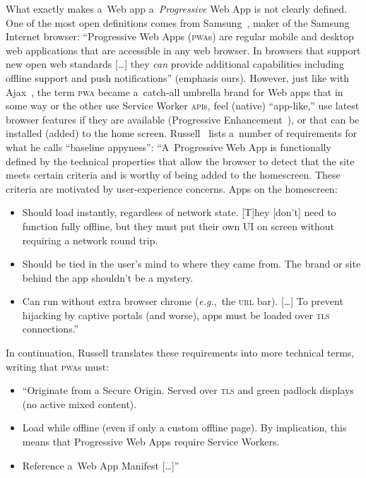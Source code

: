 \documentclass[sigconf]{acmart}
\begin{document}
What exactly makes a~Web app a~\emph{Progressive} Web App is not clearly defined.
One of the most open definitions comes from Samsung~\cite{samsung2017pwa},
maker of the Samsung Internet browser:
``Progressive Web Apps (\textsc{pwa}s) are regular mobile and desktop web applications
that are accessible in any web browser.
In browsers that support new open web standards [\ldots]
they \emph{can} provide additional capabilities
including offline support and push notifications'' (emphasis ours).
However, just like with Ajax~\cite{garret2005ajax}, the term \textsc{pwa}
became a~catch-all umbrella brand for Web apps
that in some way or the other use Service Worker \textsc{api}s,
feel (native) ``app-like,'' use latest browser features if they are available
(Progressive Enhancement~\cite{champeon2003progressiveenhancement}),
or that can be installed (added) to the home screen.
Russell~\cite{russell2016pwa} lists a~number of requirements 
for what he calls ``baseline appyness'':
``A~Progressive Web App is functionally defined by the technical properties
that allow the browser to detect that the site meets certain criteria
and is worthy of being added to the homescreen.
These criteria are motivated by user-experience concerns.
Apps on the homescreen:

\begin{itemize}
  \item Should load instantly, regardless of network state.
    [T]hey [don't] need to function fully offline,
    but they must put their own UI on screen without requiring a network round trip.
  \item Should be tied in the user's mind to where they came from.
    The brand or site behind the app shouldn't be a mystery.
  \item Can run without extra browser chrome (\emph{e.g.},\ the \textsc{url} bar).
    [\ldots] To prevent hijacking by captive portals (and worse),
    apps must be loaded over \textsc{tls} connections.''
\end{itemize}

In continuation, Russell translates these requirements into more technical terms,
writing that \textsc{pwa}s must:

\begin{itemize}
  \item ``Originate from a Secure Origin.
    Served over \textsc{tls} and green padlock displays (no active mixed content).
  \item Load while offline (even if only a custom offline page).
    By implication, this means that Progressive Web Apps require Service Workers.
  \item Reference a~Web App Manifest [\ldots]''
\end{itemize}
\end{document}
